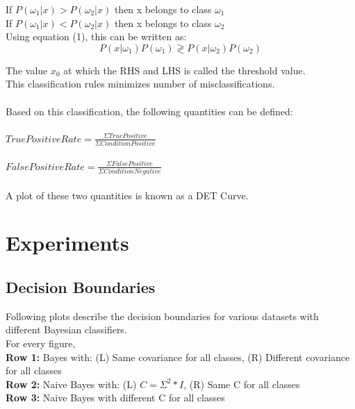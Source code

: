 \documentclass[11pt,a4paper]{article}
\begin{document}
If $P(\omega_1 | x) > P(\omega_2 | x)$ then x belongs to class $\omega_1$
\\If $P(\omega_1 | x) < P(\omega_2 | x)$ then x belongs to class $\omega_2$\\

Using equation (1), this can be written as:
 \begin{equation}
 {P(x| \omega_1)P(\omega_1) \gtrless P(x | \omega_2)P(\omega_2)}
 \end{equation}

 The value $x_0$ at which the RHS and LHS is called the threshold value. \\

This classification rules minimizes number of misclassifications. \\ \\ 

Based on this classification, the following quantities can be defined:\\ \\
$True Positive Rate = \frac{\Sigma True Positive}{\Sigma Condition Positive}$ \\ \\ 
$False Positive Rate = \frac{\Sigma False Positive}{\Sigma Condition Negative}$ \\ \\


A plot of these two quantities is known as a DET Curve. 

\clearpage
\section{Experiments}

\subsection{Decision Boundaries}
Following plots describe the decision boundaries for various datasets with different Bayesian classifiers. \\

For every figure,\\
\textbf{Row 1:} Bayes with: (L) Same covariance for all classes, (R) Different covariance for all classes\\
\textbf{Row 2:\textbf{}} Naive Bayes with: (L) $C = \Sigma^2*I$, (R) Same C for all classes\\
\textbf{Row 3:} Naive Bayes with different C for all classes\\
\end{document}
